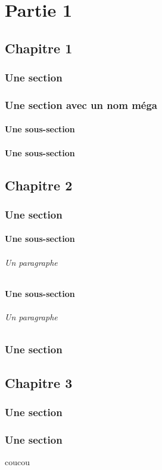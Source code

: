\documentclass{book}
\begin{document}
\tableofcontents
\part{Partie 1}
    \chapter{Chapitre 1}
        \section*{Une section}
        \section{Une section avec un nom méga }
           
        \subsection{Une sous-section}
        \subsection{Une sous-section}
    \chapter{Chapitre 2}
        \section{Une section}
            \subsection{Une sous-section}
                \paragraph{Un paragraphe}
            \subsection{Une sous-section}
                \paragraph{Un paragraphe}
        \section{Une section}
    \chapter{Chapitre 3}
        \section{Une section}
        \section{Une section}

 coucou \cite{bazant2010stability}
 
  

 
\end{document}
